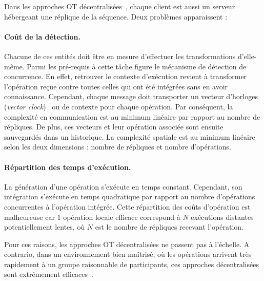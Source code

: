 
Dans les approches OT décentralisées~\cite{sun2009contextbased}, chaque client
est aussi un serveur hébergeant une réplique de la séquence. Deux problèmes
apparaissent : 

\paragraph{Coût de la détection.} Chacune de ces entités doit être en mesure
d'effectuer les transformations d'elle-même. Parmi les pré-requis à cette tâche
figure le mécanisme de détection de concurrence. En effet, retrouver le contexte
d'exécution revient à transformer l'opération reçue contre toutes celles qui ont
été intégrées sans en avoir connaissance. Cependant, chaque message doit
transporter un vecteur d'horloges (\emph{vector clock})~\cite{lamport1978time}
ou de contexte pour chaque opération. Par conséquent, la complexité en
communication est au minimum linéaire par rapport au nombre de répliques.  De
plus, ces vecteurs et leur opération associée sont ensuite sauvegardés dans un
historique. La complexité spatiale est au minimum linéaire selon les deux
dimensions : nombre de répliques et nombre d'opérations.

\paragraph{Répartition des temps d'exécution.} La génération d'une opération
s'exécute en temps constant. Cependant, son intégration s'exécute en temps
quadratique par rapport au nombre d'opérations concurrentes à l'opération
intégrée. Cette répartition des coûts d'opération est malheureuse car 1
opération locale efficace correspond à $N$ exécutions distantes potentiellement
lentes, où $N$ est le nombre de répliques recevant l'opération.

Pour ces raisons, les approches OT décentralisées ne passent pas à l'échelle. A
contrario, dans un environnement bien maîtrisé, où les opérations arrivent très
rapidement à un groupe raisonnable de participants, ces approches décentralisées
sont extrêmement efficaces~\cite{mehdi2014merging}.

